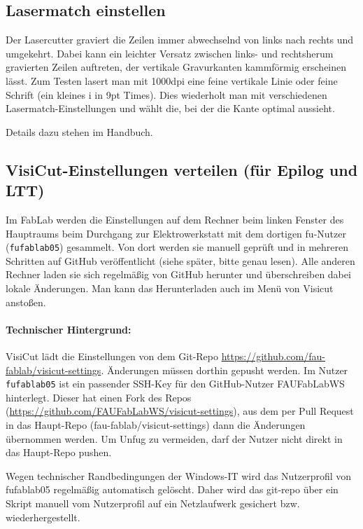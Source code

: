 \documentclass{\basedir/fablab-document}
\begin{document}
	\subsection{Lasermatch einstellen}
	Der Lasercutter graviert die Zeilen immer abwechselnd von links nach rechts und umgekehrt. Dabei kann ein leichter Versatz zwischen links- und rechtsherum gravierten Zeilen auftreten, der vertikale Gravurkanten kammförmig erscheinen lässt. Zum Testen lasert man mit 1000dpi eine feine vertikale Linie oder feine Schrift (ein kleines i in 9pt Times). Dies wiederholt man mit verschiedenen Lasermatch-Einstellungen und wählt die, bei der die Kante optimal aussieht.

	Details dazu stehen im Handbuch.

	\subsection{VisiCut-Einstellungen verteilen (für Epilog und LTT)}
	\label{sec:wartung-epilog:visicut}
	Im FabLab werden die Einstellungen auf dem Rechner beim linken Fenster des Hauptraums beim Durchgang zur Elektrowerkstatt mit dem dortigen fu-Nutzer (\texttt{fufablab05}) gesammelt. Von dort werden sie manuell geprüft und in mehreren Schritten auf GitHub veröffentlicht (siehe später, bitte genau lesen). Alle anderen Rechner laden sie sich regelmäßig von GitHub herunter und überschreiben dabei lokale Änderungen. Man kann das Herunterladen auch im Menü von Visicut anstoßen.
	
	\paragraph{Technischer Hintergrund:}
	VisiCut lädt die Einstellungen von dem Git-Repo \url{https://github.com/fau-fablab/visicut-settings}.
	Änderungen müssen dorthin gepusht werden. 
	Im Nutzer \texttt{fufablab05} ist ein passender SSH-Key für den GitHub-Nutzer FAUFabLabWS hinterlegt. Dieser hat einen Fork des Repos (\url{https://github.com/FAUFabLabWS/visicut-settings}), aus dem per Pull Request in das Haupt-Repo (fau-fablab/visicut-settings) dann die Änderungen übernommen werden. Um Unfug zu vermeiden, darf der Nutzer nicht direkt in das Haupt-Repo pushen.
	
	Wegen technischer Randbedingungen der Windows-IT wird das Nutzerprofil von fufablab05 regelmäßig automatisch gelöscht. Daher wird das git-repo über ein Skript manuell vom Nutzerprofil auf ein Netzlaufwerk gesichert bzw. wiederhergestellt.
\end{document}
